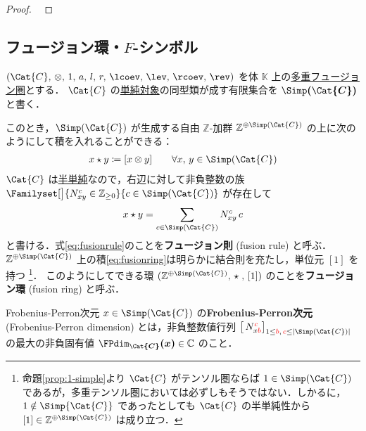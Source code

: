 \documentclass[TQFT_main]{subfiles}
\begin{document}
\begin{proof}
    ~\cite[THEOREM 4.7.15]{etingof2015tensor}
\end{proof}


\subsection{フュージョン環・$F$-シンボル}

$(\Cat{C},\, \otimes,\, 1,\, a,\, l,\, r,\, \lcoev,\, \lev,\, \rcoev,\, \rev)$ を体 $\mathbb{K}$ 上の\hyperref[def:tensorfusion-cat]{多重フュージョン圏}とする．
$\Cat{C}$ の\hyperref[def:semisimple-cat]{単純対象}の同型類が成す有限集合を $\bm{\Simp (\Cat{C})}$ と書く．

このとき，$\Simp(\Cat{C})$ が生成する自由 $\mathbb{Z}$-加群 $\mathbb{Z}^{\oplus \Simp(\Cat{C})}$ の上に次のようにして積を入れることができる：
\begin{align}
    \label{eq:fusionring}
    x \star y \coloneqq [x \otimes y]\qquad \forall x,\, y \in \Simp(\Cat{C})
\end{align}
$\Cat{C}$ は\hyperref[def:semisimple-cat]{半単純}なので，右辺に対して非負整数の族 $\Familyset[\big]{N^c_{xy} \in \mathbb{Z}_{\ge 0}}{c \in \Simp(\Cat{C})}$ が存在して
\begin{align}
    \label{eq:fusionrule}
    x \star y = \sum_{c \in \Simp(\Cat{C})} N^c_{xy}\, c
\end{align}
と書ける．式\eqref{eq:fusionrule}のことを\textbf{フュージョン則} (fusion rule) と呼ぶ．
$\mathbb{Z}^{\oplus \Simp(\Cat{C})}$ 上の積\eqref{eq:fusionring}は明らかに結合則を充たし，単位元 $[1]$ を持つ
\footnote{命題\ref{prop:1-simple}より $\Cat{C}$ がテンソル圏ならば $1 \in \Simp(\Cat{C})$ であるが，多重テンソル圏においては必ずしもそうではない．しかるに，$1 \notin \Simp{\Cat{C}}$ であったとしても $\Cat{C}$ の半単純性から $[1] \in \mathbb{Z}^{\oplus \Simp(\Cat{C})}$ は成り立つ．}．
このようにしてできる環 $(\mathbb{Z}^{\oplus \Simp(\Cat{C})},\, \star\; ,\, [1])$ のことを\textbf{フュージョン環} (fusion ring) と呼ぶ．

\begin{mydef}[label=def:FPdim]{Frobenius-Perron次元}
    $x \in \Simp(\Cat{C})$ の\textbf{Frobenius-Perron次元} (Frobenius-Perron dimension) とは，非負整数値行列 $\bigl[\, N^{\textcolor{red}{c}}_{x \textcolor{red}{b}} \bigr]_{1 \le \textcolor{red}{b},\, \textcolor{red}{c} \le \abs{\Simp(\Cat{C})}}$ の最大の非負固有値 $\bm{\FPdim_{\Cat{C}} (x)} \in \mathbb{C}$ のこと．
\end{mydef}
\end{document}
